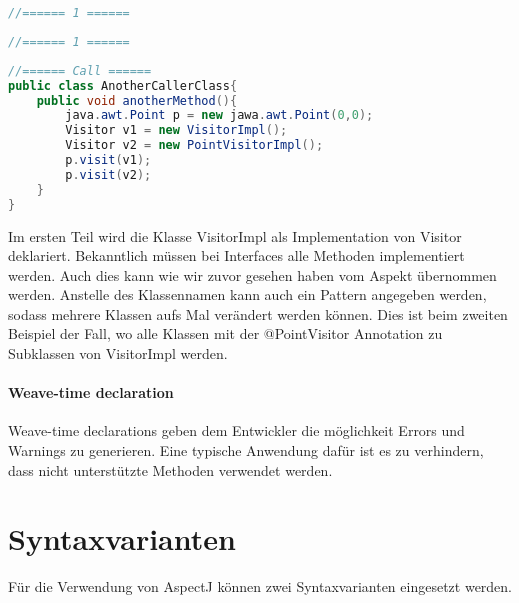 \begin{lstlisting}[language=Java]
//====== 1 ======
\end{lstlisting}




\begin{lstlisting}[language=Java]
//====== 1 ======
\end{lstlisting}




\begin{lstlisting}[language=Java]
//====== Call ======
public class AnotherCallerClass{
	public void anotherMethod(){
		java.awt.Point p = new jawa.awt.Point(0,0);
		Visitor v1 = new VisitorImpl();
		Visitor v2 = new PointVisitorImpl();
		p.visit(v1);
		p.visit(v2);
	}
}
\end{lstlisting}

Im ersten Teil wird die Klasse VisitorImpl als Implementation von Visitor deklariert. Bekanntlich müssen bei Interfaces alle Methoden implementiert werden. Auch dies kann wie wir zuvor gesehen haben vom Aspekt übernommen werden.
Anstelle des Klassennamen kann auch ein Pattern angegeben werden, sodass mehrere Klassen aufs Mal verändert werden können. Dies ist beim zweiten Beispiel der Fall, wo alle Klassen mit der @PointVisitor Annotation zu Subklassen von VisitorImpl werden.

\paragraph{Weave-time declaration}
Weave-time declarations geben dem Entwickler die möglichkeit Errors und Warnings zu generieren. Eine typische Anwendung dafür ist es zu verhindern, dass nicht unterstützte Methoden verwendet werden.

\section{Syntaxvarianten}
Für die Verwendung von AspectJ können zwei Syntaxvarianten eingesetzt werden.

